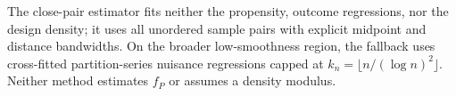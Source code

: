 The close-pair estimator fits neither the propensity, outcome regressions, nor the design density; it uses all unordered sample pairs with explicit midpoint and distance bandwidths.  On the broader low-smoothness region, the fallback uses cross-fitted partition-series nuisance regressions capped at \(k_n=\lfloor n/(\log n)^2\rfloor\).  Neither method estimates \(f_P\) or assumes a density modulus.